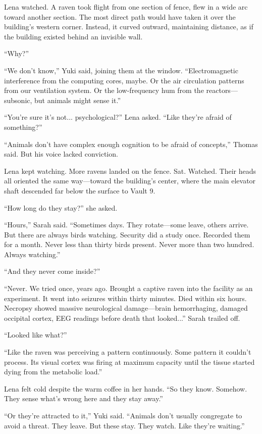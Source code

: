 Lena watched. A raven took flight from one section of fence, flew in a wide arc toward another section. The most direct path would have taken it over the building's western corner. Instead, it curved outward, maintaining distance, as if the building existed behind an invisible wall.

``Why?''

``We don't know,'' Yuki said, joining them at the window. ``Electromagnetic interference from the computing cores, maybe. Or the air circulation patterns from our ventilation system. Or the low-frequency hum from the reactors—subsonic, but animals might sense it.''

``You're sure it's not... psychological?'' Lena asked. ``Like they're afraid of something?''

``Animals don't have complex enough cognition to be afraid of concepts,'' Thomas said. But his voice lacked conviction.

Lena kept watching. More ravens landed on the fence. Sat. Watched. Their heads all oriented the same way—toward the building's center, where the main elevator shaft descended far below the surface to Vault 9.

``How long do they stay?'' she asked.

``Hours,'' Sarah said. ``Sometimes days. They rotate—some leave, others arrive. But there are always birds watching. Security did a study once. Recorded them for a month. Never less than thirty birds present. Never more than two hundred. Always watching.''

``And they never come inside?''

``Never. We tried once, years ago. Brought a captive raven into the facility as an experiment. It went into seizures within thirty minutes. Died within six hours. Necropsy showed massive neurological damage—brain hemorrhaging, damaged occipital cortex, EEG readings before death that looked...'' Sarah trailed off.

``Looked like what?''

``Like the raven was perceiving a pattern continuously. Some pattern it couldn't process. Its visual cortex was firing at maximum capacity until the tissue started dying from the metabolic load.''

Lena felt cold despite the warm coffee in her hands. ``So they know. Somehow. They sense what's wrong here and they stay away.''

``Or they're attracted to it,'' Yuki said. ``Animals don't usually congregate to avoid a threat. They leave. But these stay. They watch. Like they're waiting.''

